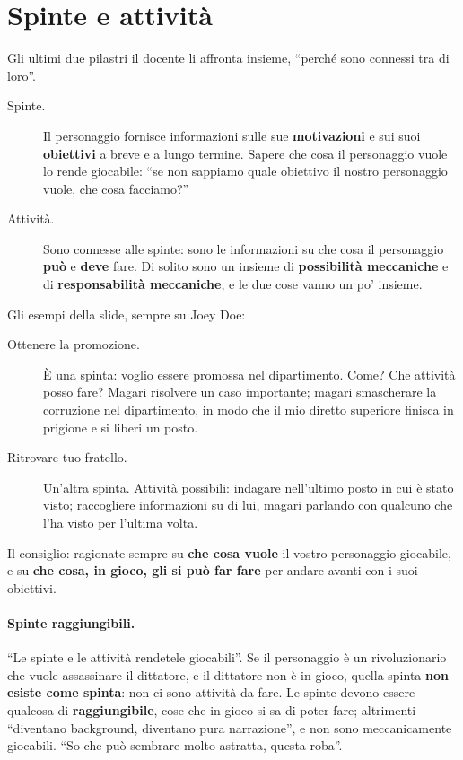 \section{Spinte e attività}
\label{a4:sec:spinte}

Gli ultimi due pilastri il docente li affronta insieme, ``perché sono connessi tra
di loro''.
\begin{description}
  \item[Spinte.] Il personaggio fornisce informazioni sulle sue
        \textbf{motivazioni} e sui suoi \textbf{obiettivi} a breve e a lungo
        termine. Sapere che cosa il personaggio vuole lo rende giocabile: ``se non
        sappiamo quale obiettivo il nostro personaggio vuole, che cosa facciamo?''
  \item[Attività.] Sono connesse alle spinte: sono le informazioni su che cosa il
        personaggio \textbf{può} e \textbf{deve} fare. Di solito sono un insieme
        di \textbf{possibilità meccaniche} e di \textbf{responsabilità
        meccaniche}, e le due cose vanno un po' insieme.
\end{description}

Gli esempi della slide, sempre su Joey Doe:
\begin{description}
  \item[Ottenere la promozione.] È una spinta: voglio essere promossa nel
        dipartimento. Come? Che attività posso fare? Magari risolvere un caso
        importante; magari smascherare la corruzione nel dipartimento, in modo che
        il mio diretto superiore finisca in prigione e si liberi un posto.
  \item[Ritrovare tuo fratello.] Un'altra spinta. Attività possibili: indagare
        nell'ultimo posto in cui è stato visto; raccogliere informazioni su di lui,
        magari parlando con qualcuno che l'ha visto per l'ultima volta.
\end{description}
Il consiglio: ragionate sempre su \textbf{che cosa vuole} il vostro personaggio
giocabile, e su \textbf{che cosa, in gioco, gli si può far fare} per andare avanti
con i suoi obiettivi.

\paragraph{Spinte raggiungibili.} ``Le spinte e le attività rendetele
giocabili''. Se il personaggio è un rivoluzionario che vuole assassinare il
dittatore, e il dittatore non è in gioco, quella spinta \textbf{non esiste come
spinta}: non ci sono attività da fare. Le spinte devono essere qualcosa di
\textbf{raggiungibile}, cose che in gioco si sa di poter fare; altrimenti
``diventano background, diventano pura narrazione'', e non sono meccanicamente
giocabili. ``So che può sembrare molto astratta, questa roba''.

